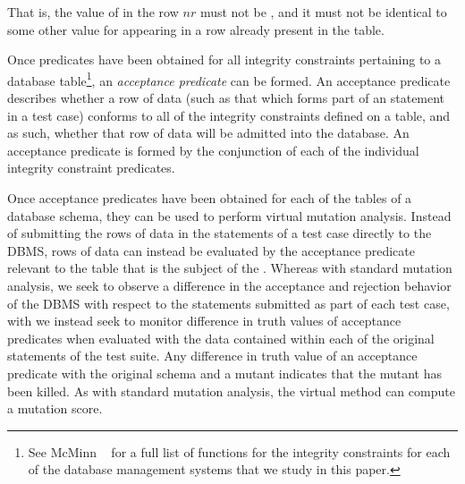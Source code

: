 \vspace{-.6em}
\begin{center}
\end{center}
\vspace{-.6em}

\noindent That is, the value of  in the row $nr$ must not
be \NULL, and it must not be identical to some other value for  appearing in a row already present in the table.

% 



Once predicates have been obtained for all integrity constraints pertaining to a database table\footnote{{\scriptsize See McMinn \etal~\cite{McMinn2015} for a full list of functions for the integrity constraints for each of the database management systems that we study in this paper.}}, an {\it acceptance predicate} can be formed. An acceptance predicate describes whether a row of data (such as that which forms part of an \INSERT statement in a test case) conforms to all of the integrity constraints defined on a table, and as such, whether that row of data will be admitted into the database. An acceptance predicate is formed by the conjunction of each of the individual integrity constraint predicates.


 Once acceptance predicates have been obtained for each of the tables of a database schema, they can be used to perform virtual mutation analysis. Instead of submitting the rows of data in the \INSERT statements of a test case directly to the DBMS, rows of data can instead be evaluated by the acceptance predicate relevant to the table that is the subject of the \INSERT. Whereas with standard mutation analysis, we seek to observe a difference in the acceptance and rejection behavior of the DBMS with respect to the \INSERT statements submitted as part of each test case, with \vma we instead seek to monitor difference in truth values of acceptance predicates when evaluated with the data contained within each of the original \INSERT statements of the test suite. Any difference in truth value of an acceptance predicate with the original schema and a mutant indicates that the mutant has been killed.  As with standard mutation analysis, the virtual method can compute a mutation score.

